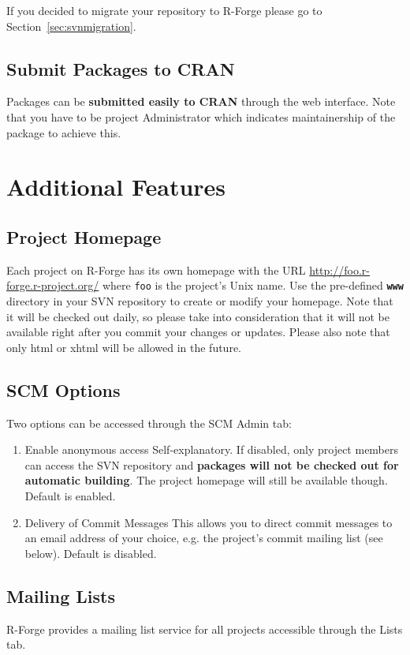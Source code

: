 \documentclass[a4paper]{article}
\newcommand{\proglang}[1]{\textsf{#1}}
\begin{document}
If you decided to migrate your repository to \proglang{R}-Forge please go to
Section~\ref{sec:svnmigration}.

\subsection{Submit Packages to CRAN}
Packages can be \textbf{submitted easily to CRAN} through the web interface.
Note that you have to be project Administrator which indicates maintainership
of the package to achieve this. 


\section{Additional Features}

\subsection{Project Homepage}
Each project on \proglang{R}-Forge has its own homepage with the URL
\url{http://foo.r-forge.r-project.org/} where \texttt{foo} is the
project's Unix name. Use the
pre-defined \textbf{\texttt{www}} directory in your SVN repository to
create or modify your homepage. Note that it will be checked out
daily, so please take into consideration that it will not be available
right after you commit your changes or updates. Please also note that
only html or xhtml will be allowed in the future.


\subsection{SCM Options}
\label{sec:scmoptions}
Two options can be accessed through the SCM Admin tab:
\begin{enumerate}
\item{Enable anonymous access} Self-explanatory. If disabled, only
  project members can access the SVN repository and  \textbf{packages
    will not be checked out for automatic building}. The project
  homepage will still be available though. Default is enabled.

\item{Delivery of Commit Messages} This allows you to direct commit
  messages to an email address of your choice, e.g. the project's
  commit mailing list (see below). Default is disabled.
\end{enumerate}


\subsection{Mailing Lists}
\proglang{R}-Forge provides a mailing list service for all projects accessible
through the Lists tab.  
\end{document}
